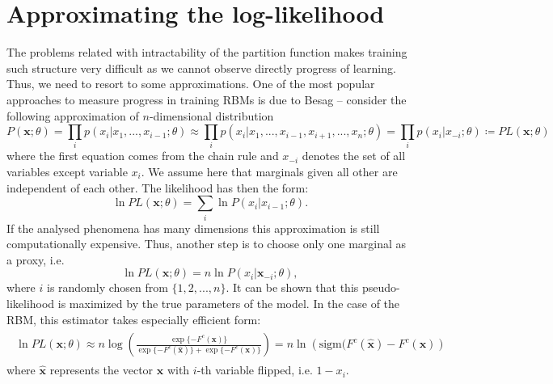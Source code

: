 \section{Approximating the log-likelihood}
The problems related with intractability of the partition function makes training such structure very difficult as we cannot observe directly progress of learning. Thus, we need to resort to some approximations. One of the most popular approaches to measure progress in training RBMs is due to Besag \cite{besag1972nearest} -- consider the following approximation of $n$-dimensional distribution
\begin{equation}
P(\mathbf{x}; \theta) = \prod_i p(x_i| x_1,...,x_{i-1};\theta) \approx \prod_i p(x_i | x_1, ..., x_{i-1}, x_{i+1},..., x_n;\theta) = \prod_i p(x_i| x_{-i} ;\theta) \coloneqq PL (\mathbf{x};\theta) 
\end{equation}
where the first equation comes from the chain rule and $x_{-i}$ denotes the set of all variables except variable $x_i$. We assume here that marginals given all other are independent of each other. The likelihood has then the form:
\begin{equation}
\ln PL(\mathbf{x}; \theta) = \sum_i \ln P(x_i | x_{i-1} ;\theta).
\end{equation}
If the analysed phenomena has many dimensions this approximation is still computationally expensive. Thus, another step is to choose only one marginal as a proxy, i.e.
\begin{equation}
\ln PL(\mathbf{x}; \theta) = n \ln P(x_i | \mathbf{x}_{-i} ; \theta),
\end{equation}
where $i$ is randomly chosen from $\{1,2, ..., n\}$. It can be shown that this pseudo-likelihood is maximized by the true parameters of the model. In the case of the RBM, this estimator takes especially efficient form:
\begin{align}
\begin{split}
\ln PL(\mathbf{x}; \theta) \approx n \log \left( \frac{\exp\{- F^c(\mathbf{x})\}}{\exp\{-F^c(\mathbf{\hat{x}})\} + \exp\{- F^c(\mathbf{x})\}} \right) = n \ln \left( \text{sigm}(F^c(\mathbf{\hat{x}}) - F^c(\mathbf{x}) \right)
\label{eq:pseudoLL}
\end{split}
\end{align}
where $\mathbf{\hat{x}}$ represents the vector $\mathbf{x}$ with $i$-th variable flipped, i.e. $1-x_i$.

